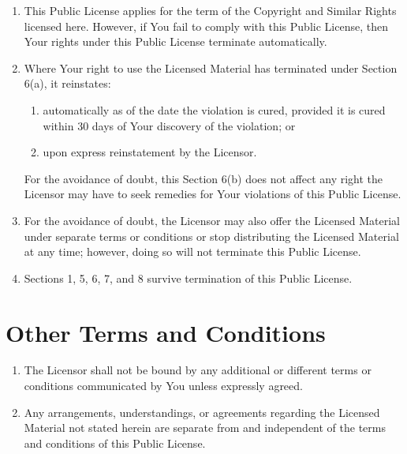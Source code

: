 \begin{enumerate}[label=\alph*.]
\item This Public License applies for the term of the Copyright and
  Similar Rights licensed here. However, if You fail to comply with
  this Public License, then Your rights under this Public License
  terminate automatically.
\item Where Your right to use the Licensed Material has terminated
  under Section 6(a), it reinstates:

  \begin{enumerate}[label=\arabic*.]
  \item automatically as of the date the violation is cured, provided
    it is cured within 30 days of Your discovery of the violation; or
  \item upon express reinstatement by the Licensor.
  \end{enumerate}

  For the avoidance of doubt, this Section 6(b) does not affect any
  right the Licensor may have to seek remedies for Your violations of
  this Public License.

\item For the avoidance of doubt, the Licensor may also offer the
  Licensed Material under separate terms or conditions or stop
  distributing the Licensed Material at any time; however, doing so
  will not terminate this Public License.
\item Sections 1, 5, 6, 7, and 8 survive termination of this Public
     License.
\end{enumerate}

\section{Other Terms and Conditions}

\begin{enumerate}[label=\alph*.]
\item The Licensor shall not be bound by any additional or different
  terms or conditions communicated by You unless expressly agreed.
\item Any arrangements, understandings, or agreements regarding the
  Licensed Material not stated herein are separate from and
  independent of the terms and conditions of this Public License.
\end{enumerate}

